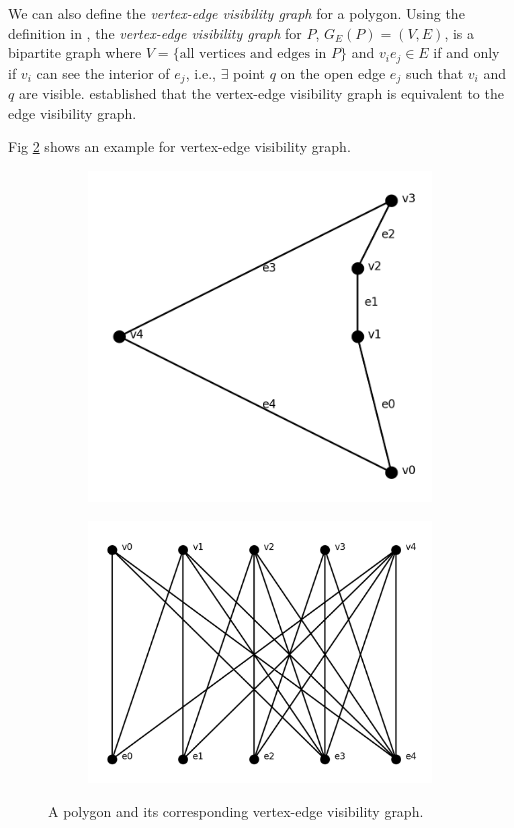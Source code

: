 \documentclass[]{styles/svproc}  %
\begin{document}
We can also define the \textit{vertex-edge visibility graph} for a polygon.
Using the definition in \cite{rourke_viz}, the
\textit{vertex-edge visibility graph} for $P$, $G_E(P) = (V, E)$, is a bipartite
graph where $V = \{\text{all vertices and edges in $P$}\}$ and $v_ie_j\in E$ if
and only if $v_i$ can see the interior of $e_j$, i.e., $\exists$ point $q$ on
the open edge $e_j$ such that $v_i$ and $q$ are visible. \cite{rourke_viz}
established that the vertex-edge visibility graph is equivalent to the edge
visibility graph.

Fig \ref{fig:veg} shows an example for vertex-edge visibility graph.

\begin{figure}
\centering
\begin{subfigure}{0.25\textwidth}
  \includegraphics[width=0.6\linewidth]{figures/concave_pent.png}
  \label{fig:c_p}
\end{subfigure}%
\begin{subfigure}{0.25\textwidth}
  \includegraphics[width=0.8\linewidth]{figures/viz_edge_graph.png}
\end{subfigure}
\caption{A polygon and its corresponding vertex-edge visibility graph.\label{fig:veg}}

\end{figure}
\end{document}
